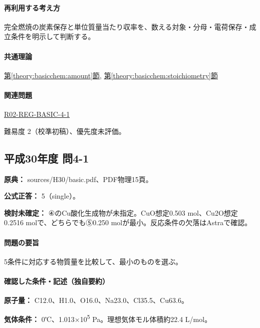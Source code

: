 \paragraph{再利用する考え方} 完全燃焼の炭素保存と単位質量当たり収率を、数える対象・分母・電荷保存・成立条件を明示して判断する。

\paragraph{共通理論} \hyperref[theory:basicchem:amount]{第\ref*{theory:basicchem:amount}節}, \hyperref[theory:basicchem:stoichiometry]{第\ref*{theory:basicchem:stoichiometry}節}

\paragraph{関連問題} \hyperref[q:r02-reg-basic-4-1]{R02-REG-BASIC-4-1}

\par 難易度 2（校準初稿）、優先度未評価。

\subsection{平成30年度 問4-1}
\label{q:h30-reg-basic-4-1}

\noindent\textbf{原典：} sources/H30/basic.pdf、PDF物理15頁。

\textbf{公式正答：} 5（single）。

\par\textbf{検討未確定：} ④のCu酸化生成物が未指定。CuO想定0.503 mol、Cu2O想定0.2516 molで、どちらでも⑤0.250 molが最小。反応条件の欠落はAstraで確認。

\paragraph{問題の要旨} 5条件に対応する物質量を比較して、最小のものを選ぶ。

\paragraph{確認した条件・記述（独自要約）}\mbox{}\par

\noindent\textbf{原子量：} C12.0、H1.0、O16.0、Na23.0、Cl35.5、Cu63.6。\par

\noindent\textbf{気体条件：} 0℃、1.013×10\textsuperscript{5} Pa。理想気体モル体積約22.4 L/mol。\par


